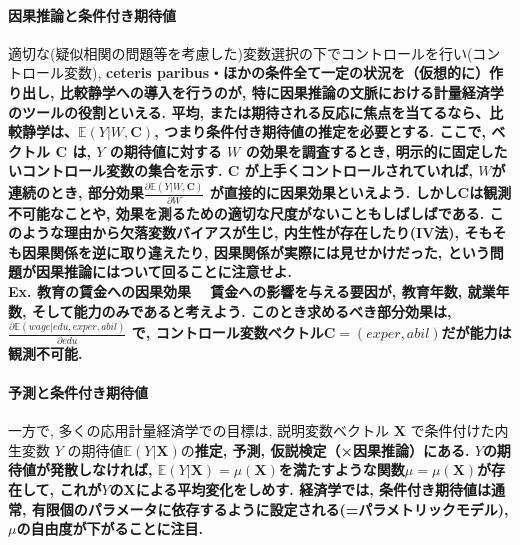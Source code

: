 \documentclass[paper=a4paper,fontsize=10pt]{jlreq}
\begin{document}
\paragraph{因果推論と条件付き期待値}
適切な(疑似相関の問題等を考慮した)変数選択の下でコントロールを行い(\rightarrow コントロール変数), \rmfamily\mcfamily\bfseries{ceteris paribus・ほかの条件全て一定}\mdseries の状況を（仮想的に）作り出し, \rmfamily\mcfamily\bfseries{比較静学}\mdseries への導入を行うのが, 特に因果推論の文脈における計量経済学のツールの役割といえる. 平均, または期待される反応に焦点を当てるなら、比較静学は、$\mathbb{E}(Y|W, \mathbf{C})$, つまり条件付き期待値の推定を必要とする. ここで, ベクトル $\mathbf{C}$ は, $Y$ の期待値に対する $W$ の効果を調査するとき, 明示的に\rmfamily\mcfamily\bfseries{固定したいコントロール変数の集合}\mdseries を示す. $\mathbf{C}$ が上手くコントロールされていれば, $W$が連続のとき, \rmfamily\mcfamily\bfseries{部分効果}\mdseries $\frac{\partial \mathbb{E}(Y|W, \mathbf{C})}{\partial W}$ が直接的に因果効果といえよう. しかし$\mathbf{C}$は観測不可能なことや, 効果を測るための適切な尺度がないこともしばしばである. このような理由から欠落変数バイアスが生じ, 内生性が存在したり(\rightarrow IV法), そもそも因果関係を逆に取り違えたり, 因果関係が実際には見せかけだった, という問題が因果推論にはついて回ることに注意せよ.\\

\rmfamily\mcfamily\bfseries{Ex. 教育の賃金への因果効果}\mdseries　
賃金への影響を与える要因が, 教育年数, 就業年数, そして能力のみであると考えよう. このとき求めるべき部分効果は, $\frac{\partial \mathbb{E}(wage|edu, exper, abil)}{\partial edu}$ で, コントロール変数ベクトル$\mathbf{C}=(exper, abil)$だが能力は\rmfamily\mcfamily\bfseries{観測不可能}\mdseries . \\

\paragraph{予測と条件付き期待値}
一方で, 多くの応用計量経済学での目標は, 説明変数ベクトル $\mathbf{X}$ で条件付けた内生変数 $Y$ の期待値$\mathbb{E}(Y|\mathbf{X})$の\rmfamily\mcfamily\bfseries{推定, 予測, 仮説検定（×因果推論）}\mdseries にある. $Y$の期待値が発散しなければ, $\mathbb{E}(Y|\mathbf{X})=\mu(\mathbf{X})$を満たすような関数$\mu=\mu(\mathbf{X})$が存在して, これが$Y$の$\mathbf{X}$による平均変化をしめす. 経済学では, 条件付き期待値は通常, 有限個のパラメータに依存するように設定される(=\rmfamily\mcfamily\bfseries{パラメトリックモデル}\mdseries ), $\mu$の自由度が下がることに注目.\\
\end{document}
